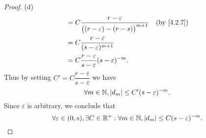 \begin{proof}{(d)}
\begin{align*}
                                & = C \dfrac{r - \varepsilon}{\big((r - \varepsilon) - (r - s)\big)^{m + 1}}                      &  & \by{4.2.7}                  \\
                                & = C \dfrac{r - \varepsilon}{(s - \varepsilon)^{m + 1}}                                                                           \\
                                & = C \dfrac{r - \varepsilon}{s - \varepsilon} (s - \varepsilon)^{-m}.
  \end{align*}
  Thus by setting \(C' = C \dfrac{r - \varepsilon}{s - \varepsilon}\) we have
  \[
    \forall m \in \mathbb{N}, \left\lvert d_m\right\rvert \leq C' (s - \varepsilon)^{-m}.
  \]
  Since \(\varepsilon\) is arbitrary, we conclude that
  \[
    \forall \varepsilon \in (0, s), \exists C \in \mathbb{R}^+ : \forall m \in \mathbb{N}, \left\lvert d_m\right\rvert \leq C (s - \varepsilon)^{-m}.
  \]
\end{proof}

